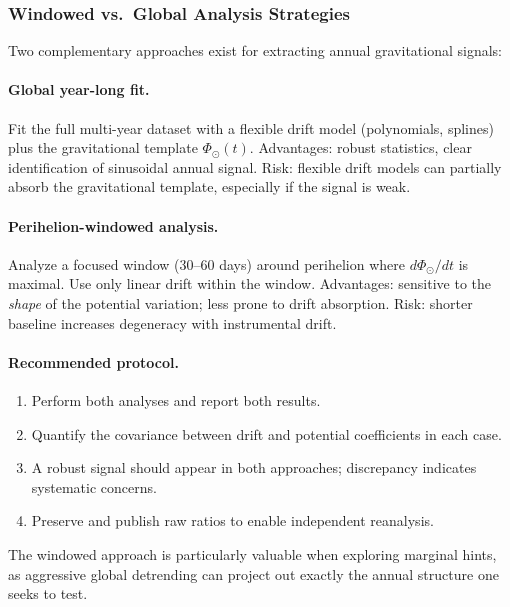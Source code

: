 \subsubsection{Windowed vs.\ Global Analysis Strategies}

Two complementary approaches exist for extracting annual gravitational signals:

\paragraph{Global year-long fit.}
Fit the full multi-year dataset with a flexible drift model (polynomials, splines) plus the gravitational template $\Phi_\odot(t)$. Advantages: robust statistics, clear identification of sinusoidal annual signal. Risk: flexible drift models can partially absorb the gravitational template, especially if the signal is weak.

\paragraph{Perihelion-windowed analysis.}
Analyze a focused window (30--60 days) around perihelion where $d\Phi_\odot/dt$ is maximal. Use only linear drift within the window. Advantages: sensitive to the \textit{shape} of the potential variation; less prone to drift absorption. Risk: shorter baseline increases degeneracy with instrumental drift.

\paragraph{Recommended protocol.}
\begin{enumerate}
\item Perform both analyses and report both results.
\item Quantify the covariance between drift and potential coefficients in each case.
\item A robust signal should appear in both approaches; discrepancy indicates systematic concerns.
\item Preserve and publish raw ratios to enable independent reanalysis.
\end{enumerate}

The windowed approach is particularly valuable when exploring marginal hints, as aggressive global detrending can project out exactly the annual structure one seeks to test.

